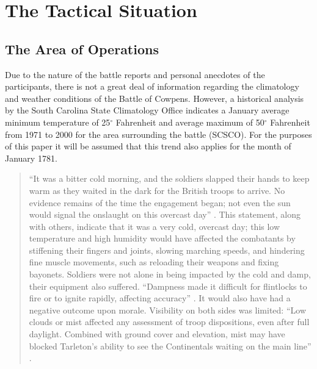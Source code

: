 \section{The Tactical Situation}


\subsection{The Area of Operations}


Due to the nature of the battle reports and personal anecdotes of the
participants, there is not a great deal of information regarding the climatology
and weather conditions of the Battle of Cowpens.  However, a historical analysis
by the South Carolina State Climatology Office indicates a January average
minimum temperature of 25$^\circ$ Fahrenheit and average maximum of 50$^\circ$ Fahrenheit from
1971 to 2000 for the area surrounding the battle (SCSCO).  For the purposes of
this paper it will be assumed that this trend also applies for the month of
January 1781.

\begin{quote}
``It was a bitter cold morning, and the soldiers slapped their hands to keep warm
as they waited in the dark for the British troops to arrive.  No evidence
remains of the time the engagement began; not even the sun would signal the
onslaught on this overcast day'' \cite[51]{moncure_cowpens_1996}.  This statement, along with
others, indicate that it was a very cold, overcast day; this low  temperature
and high humidity would have affected the combatants by stiffening their fingers
and joints, slowing marching speeds, and hindering fine muscle movements, such
as reloading their weapons and fixing bayonets. Soldiers were not alone in being
impacted by the cold and damp, their equipment also suffered.  ``Dampness made it
difficult for flintlocks to fire or to ignite rapidly, affecting accuracy'' \cite[79]{babits_devil_2001}.
It would also have had a negative outcome upon morale. 
Visibility on both sides was limited: ``Low clouds or mist affected any
assessment of troop dispositions, even after full daylight.  Combined with
ground cover and elevation, mist may have blocked Tarleton's ability to see the
Continentals waiting on the main line'' \cite[80]{babits_devil_2001}.
\end{quote}

